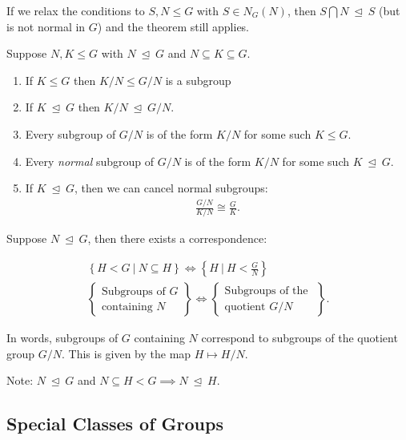 If we relax the conditions to \(S, N \leq G\) with \(S \in N_G(N)\),
then \(S\bigcap N {~\trianglelefteq~}S\) (but is not normal in \(G\))
and the theorem still applies.

Suppose \(N, K \leq G\) with \(N {~\trianglelefteq~}G\) and
\(N\subseteq K \subseteq G\).

\begin{enumerate}
\def\labelenumi{\arabic{enumi}.}
\tightlist
\item
  If \(K\leq G\) then \(K/N \leq G/N\) is a subgroup
\item
  If \(K{~\trianglelefteq~}G\) then \(K/N {~\trianglelefteq~}G/N\).
\item
  Every subgroup of \(G/N\) is of the form \(K/N\) for some such
  \(K \leq G\).
\item
  Every \emph{normal} subgroup of \(G/N\) is of the form \(K/N\) for
  some such \(K {~\trianglelefteq~}G\).
\item
  If \(K{~\trianglelefteq~}G\), then we can cancel normal subgroups:
  \begin{align*}  
  \frac{G/N}{K/N} \cong \frac{G}{K}
  .\end{align*}
\end{enumerate}

Suppose \(N {~\trianglelefteq~}G\), then there exists a correspondence:

\begin{align*}  
\left\{
H < G {~\mathrel{\Big|}~}N \subseteq H
\right\}
\iff
\left\{
H {~\mathrel{\Big|}~}H < \frac G N
\right\}
\\
\left\{{\substack{
  \text{Subgroups of $G$} \\
  \text{containing $N$}
}}\right\} \iff
\left\{{\substack{
  \text{Subgroups of the } \\
  \text{quotient $G/N$}
}}\right\}
.\end{align*}

In words, subgroups of \(G\) containing \(N\) correspond to subgroups of
the quotient group \(G/N\). This is given by the map \(H \mapsto H/N\).

Note: \(N {~\trianglelefteq~}G\) and
\(N \subseteq H < G \implies N {~\trianglelefteq~}H\).

\hypertarget{special-classes-of-groups}{%
\subsection{Special Classes of Groups}\label{special-classes-of-groups}}

